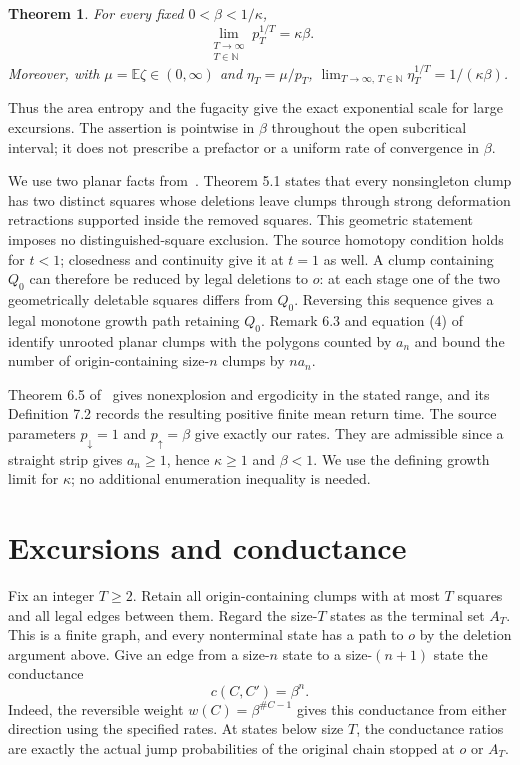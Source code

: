 \documentclass[11pt]{article}
\newtheorem{theorem}{Theorem}
\newcommand{\E}{\mathbb E}
\begin{document}
\begin{theorem}\label{thm:main}
For every fixed $0<\beta<1/\kappa$,
\begin{equation}\label{eq:rate}
 \lim_{\substack{T\to\infty\\T\in\mathbb N}}p_T^{1/T}=\kappa\beta.
\end{equation}
Moreover, with $\mu=\E\zeta\in(0,\infty)$ and $\eta_T=\mu/p_T$,
$\lim_{T\to\infty,\,T\in\mathbb N}\eta_T^{1/T}=1/(\kappa\beta)$.
\end{theorem}

Thus the area entropy and the fugacity give the exact exponential scale
for large excursions. The assertion is pointwise in $\beta$ throughout
the open subcritical interval; it does not prescribe a prefactor or a
uniform rate of convergence in $\beta$.

We use two planar facts from~\cite{BO}. Theorem 5.1 states that every
nonsingleton clump has two distinct squares whose deletions leave clumps
through strong deformation retractions supported inside the removed
squares. This geometric statement imposes no distinguished-square
exclusion. The source homotopy condition holds for $t<1$; closedness and
continuity give it at $t=1$ as well. A clump containing $Q_0$ can therefore
be reduced by legal deletions to $o$: at each stage one of the two
geometrically deletable squares differs from $Q_0$. Reversing this sequence
gives a legal monotone growth path retaining $Q_0$. Remark 6.3 and equation (4)
of~\cite{BO} identify unrooted planar clumps with the polygons counted by
$a_n$ and bound the number of origin-containing size-$n$ clumps by $na_n$.

Theorem 6.5 of~\cite{BO} gives nonexplosion and ergodicity in the stated
range, and its Definition 7.2 records the resulting positive finite mean
return time. The source parameters $p_\downarrow=1$ and
$p_\uparrow=\beta$ give exactly our rates. They are admissible since a
straight strip gives $a_n\ge1$, hence $\kappa\ge1$ and $\beta<1$.
We use the defining growth limit for $\kappa$; no additional enumeration
inequality is needed.

\section{Excursions and conductance}

Fix an integer $T\ge2$. Retain all origin-containing clumps with at most
$T$ squares and all legal edges between them. Regard the size-$T$ states
as the terminal set $A_T$. This is a finite graph, and every nonterminal
state has a path to $o$ by the deletion argument above. Give an edge from
a size-$n$ state to a size-$(n+1)$ state the conductance
\begin{equation}\label{eq:conductance}
 c(C,C')=\beta^n.
\end{equation}
Indeed, the reversible weight $w(C)=\beta^{\#C-1}$ gives this conductance
from either direction using the specified rates. At states below size $T$,
the conductance ratios are exactly the actual jump probabilities of the
original chain stopped at $o$ or $A_T$.
\end{document}
